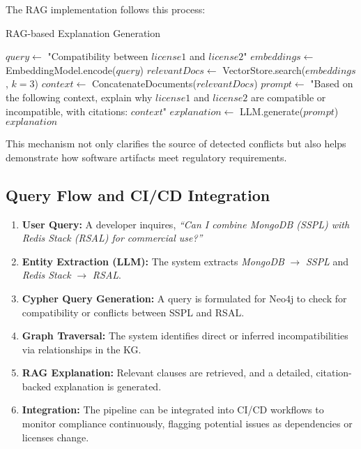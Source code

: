 \documentclass[12pt]{article}
\begin{document}
The RAG implementation follows this process:

\begin{algorithm}
\caption{RAG-based Explanation Generation}
\begin{algorithmic}[1]
    \State $query \gets$ "Compatibility between $license1$ and $license2$"
    \State $embeddings \gets$ EmbeddingModel.encode($query$)
    \State $relevantDocs \gets$ VectorStore.search($embeddings$, $k=3$)
    \State $context \gets$ ConcatenateDocuments($relevantDocs$)
    \State $prompt \gets$ "Based on the following context, explain why $license1$ and $license2$ are compatible or incompatible, with citations: $context$"
    \State $explanation \gets$ LLM.generate($prompt$)
    \State \Return $explanation$
\EndProcedure
\end{algorithmic}
\end{algorithm}

This mechanism not only clarifies the source of detected conflicts but also helps demonstrate how software artifacts meet regulatory requirements.

\subsection{Query Flow and CI/CD Integration}
\begin{enumerate}
    \item \textbf{User Query:} A developer inquires, \emph{``Can I combine MongoDB (SSPL) with Redis Stack (RSAL) for commercial use?''}
    \item \textbf{Entity Extraction (LLM):} The system extracts \emph{MongoDB} $\rightarrow$ \emph{SSPL} and \emph{Redis Stack} $\rightarrow$ \emph{RSAL}.
    \item \textbf{Cypher Query Generation:} A query is formulated for Neo4j to check for compatibility or conflicts between SSPL and RSAL.
    \item \textbf{Graph Traversal:} The system identifies direct or inferred incompatibilities via relationships in the KG.
    \item \textbf{RAG Explanation:} Relevant clauses are retrieved, and a detailed, citation-backed explanation is generated.
    \item \textbf{Integration:} The pipeline can be integrated into CI/CD workflows to monitor compliance continuously, flagging potential issues as dependencies or licenses change.
\end{enumerate}
\end{document}
